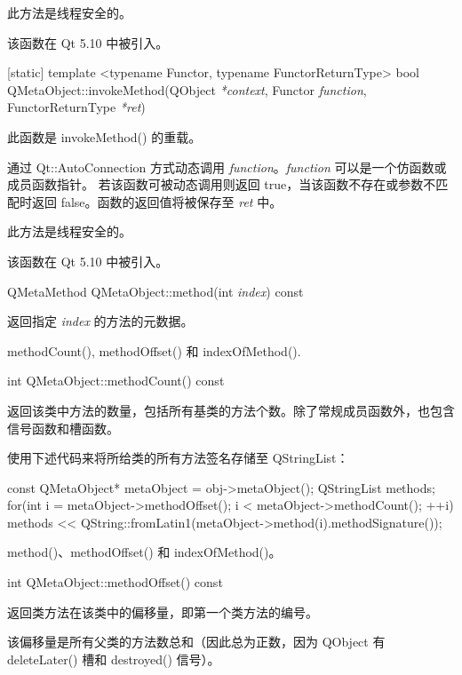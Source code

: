 \begin{notice}
此方法是线程安全的。
\end{notice}

该函数在 Qt 5.10 中被引入。

[static] template <typename Functor, typename FunctorReturnType> bool QMetaObject::invokeMethod(QObject \emph{*context}, Functor \emph{function}, FunctorReturnType \emph{*ret})

此函数是 invokeMethod() 的重载。

通过 Qt::AutoConnection 方式动态调用 \emph{function}。\emph{function} 可以是一个仿函数或成员函数指针。
若该函数可被动态调用则返回 true，当该函数不存在或参数不匹配时返回 false。函数的返回值将被保存至 \emph{ret} 中。


\begin{notice}
此方法是线程安全的。
\end{notice}


该函数在 Qt 5.10 中被引入。

QMetaMethod QMetaObject::method(int \emph{index}) const

返回指定 \emph{index} 的方法的元数据。

\begin{seeAlso}
methodCount(), methodOffset() 和 indexOfMethod().
\end{seeAlso}

int QMetaObject::methodCount() const

返回该类中方法的数量，包括所有基类的方法个数。除了常规成员函数外，也包含信号函数和槽函数。

使用下述代码来将所给类的所有方法签名存储至 QStringList：

\begin{cppcode}
 const QMetaObject* metaObject = obj->metaObject();
 QStringList methods;
 for(int i = metaObject->methodOffset(); i < metaObject->methodCount(); ++i)
     methods << QString::fromLatin1(metaObject->method(i).methodSignature());
\end{cppcode}

\begin{seeAlso}
method()、methodOffset() 和 indexOfMethod()。
\end{seeAlso}

int QMetaObject::methodOffset() const

返回类方法在该类中的偏移量，即第一个类方法的编号。

该偏移量是所有父类的方法数总和（因此总为正数，因为 QObject 有 deleteLater() 槽和 destroyed() 信号）。


